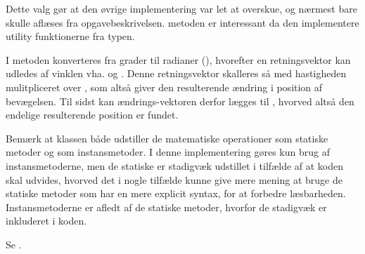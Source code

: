 Dette valg gør at den øvrige implementering var let at overskue, og nærmest bare skulle aflæses fra opgavebeskrivelsen.  metoden er interessant da den implementere utility funktionerne fra  typen.

I  metoden konverteres  fra grader til radianer (), hvorefter en retningsvektor kan udledes af vinklen vha.  og . Denne retningsvektor skalleres så med hastigheden mulitpliceret over , som altså giver den resulterende ændring i position af bevægelsen. Til sidst kan ændrings-vektoren derfor lægges til , hvorved altså den endelige resulterende position er fundet.

Bemærk at  klassen både udstiller de matematiske operationer som statiske metoder og som instansmetoder. I denne implementering gøres kun brug af instansmetoderne, men de statiske er stadigvæk udstillet i tilfælde af at koden skal udvides, hvorved det i nogle tilfælde kunne give mere mening at bruge de statiske metoder som har en mere explicit syntax, for at forbedre læsbarheden. Instansmetoderne er afledt af de statiske metoder, hvorfor de stadigvæk er inkluderet i koden.

Se .

